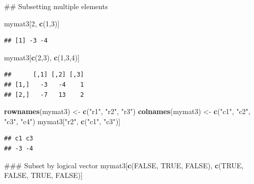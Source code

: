 \documentclass[]{book}
\newenvironment{Shaded}{\begin{snugshade}}{\end{snugshade}}
\newcommand{\KeywordTok}[1]{\textcolor[rgb]{0.13,0.29,0.53}{\textbf{{#1}}}}
\newcommand{\DecValTok}[1]{\textcolor[rgb]{0.00,0.00,0.81}{{#1}}}
\newcommand{\StringTok}[1]{\textcolor[rgb]{0.31,0.60,0.02}{{#1}}}
\newcommand{\OtherTok}[1]{\textcolor[rgb]{0.56,0.35,0.01}{{#1}}}
\newcommand{\NormalTok}[1]{{#1}}
\begin{document}
\begin{Shaded}
\begin{Highlighting}[]
\NormalTok{## Subsetting multiple elements}

\NormalTok{mymat3[}\DecValTok{2}\NormalTok{, }\KeywordTok{c}\NormalTok{(}\DecValTok{1}\NormalTok{,}\DecValTok{3}\NormalTok{)]}
\end{Highlighting}
\end{Shaded}

\begin{verbatim}
## [1] -3 -4
\end{verbatim}

\begin{Shaded}
\begin{Highlighting}[]
\NormalTok{mymat3[}\KeywordTok{c}\NormalTok{(}\DecValTok{2}\NormalTok{,}\DecValTok{3}\NormalTok{), }\KeywordTok{c}\NormalTok{(}\DecValTok{1}\NormalTok{,}\DecValTok{3}\NormalTok{,}\DecValTok{4}\NormalTok{)]}
\end{Highlighting}
\end{Shaded}

\begin{verbatim}
##      [,1] [,2] [,3]
## [1,]   -3   -4    1
## [2,]   -7   13    2
\end{verbatim}

\begin{Shaded}
\begin{Highlighting}[]
\KeywordTok{rownames}\NormalTok{(mymat3) <-}\StringTok{ }\KeywordTok{c}\NormalTok{(}\StringTok{"r1"}\NormalTok{, }\StringTok{"r2"}\NormalTok{, }\StringTok{"r3"}\NormalTok{)}
\KeywordTok{colnames}\NormalTok{(mymat3) <-}\StringTok{ }\KeywordTok{c}\NormalTok{(}\StringTok{"c1"}\NormalTok{, }\StringTok{"c2"}\NormalTok{, }\StringTok{"c3"}\NormalTok{, }\StringTok{"c4"}\NormalTok{)}
\NormalTok{mymat3[}\StringTok{"r2"}\NormalTok{, }\KeywordTok{c}\NormalTok{(}\StringTok{"c1"}\NormalTok{, }\StringTok{"c3"}\NormalTok{)]}
\end{Highlighting}
\end{Shaded}

\begin{verbatim}
## c1 c3 
## -3 -4
\end{verbatim}

\begin{Shaded}
\begin{Highlighting}[]
\NormalTok{### Subset by logical vector}
\NormalTok{mymat3[}\KeywordTok{c}\NormalTok{(}\OtherTok{FALSE}\NormalTok{, }\OtherTok{TRUE}\NormalTok{, }\OtherTok{FALSE}\NormalTok{),}
       \KeywordTok{c}\NormalTok{(}\OtherTok{TRUE}\NormalTok{, }\OtherTok{FALSE}\NormalTok{, }\OtherTok{TRUE}\NormalTok{, }\OtherTok{FALSE}\NormalTok{)]}
\end{Highlighting}
\end{Shaded}
\end{document}
